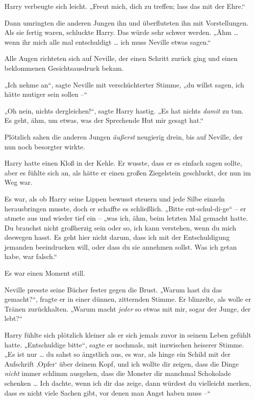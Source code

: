 Harry verbeugte sich leicht. „Freut mich, dich zu treffen; lass das mit der Ehre.“ 

Dann umringten die anderen Jungen ihn und überfluteten ihn mit Vorstellungen. Als sie fertig waren, schluckte Harry. Das würde sehr schwer werden. „Ähm … wenn ihr mich alle mal entschuldigt … ich muss Neville etwas sagen.“ 

Alle Augen richteten sich auf Neville, der einen Schritt zurück ging und einen beklommenen Gesichtsausdruck bekam. 

„Ich nehme an“, sagte Neville mit verschüchterter Stimme, „du willst sagen, ich hätte mutiger sein sollen –“ 

„Oh nein, nichts dergleichen!“, sagte Harry hastig. „Es hat nichts \emph{damit} zu tun. Es geht, ähm, um etwas, was der Sprechende Hut mir gesagt hat.“ 

Plötzlich sahen die anderen Jungen \emph{äußerst} neugierig drein, bis auf Neville, der nun noch besorgter wirkte. 

Harry hatte einen Kloß in der Kehle. Er wusste, dass er es einfach sagen sollte, aber es fühlte sich an, als hätte er einen großen Ziegelstein geschluckt, der nun im Weg war. 

Es war, als ob Harry seine Lippen bewusst steuern und jede Silbe einzeln herausbringen musste, doch er schaffte es schließlich. „Bitte ent-schul-di-ge“ – er atmete aus und wieder tief ein – „was ich, ähm, beim letzten Mal gemacht hatte. Du brauchst nicht großherzig sein oder so, ich kann verstehen, wenn du mich deswegen hasst. Es geht hier nicht darum, dass ich mit der Entschuldigung jemanden beeindrucken will, oder dass du sie annehmen sollst. Was ich getan habe, war falsch.“ 

Es war einen Moment still. 

Neville presste seine Bücher fester gegen die Brust. „Warum hast du das gemacht?“, fragte er in einer dünnen, zitternden Stimme. Er blinzelte, als wolle er Tränen zurückhalten. „Warum macht \emph{jeder} so etwas mit mir, sogar der Junge, der lebt?“ 

Harry fühlte sich plötzlich kleiner als er sich jemals zuvor in seinem Leben gefühlt hatte. „Entschuldige bitte“, sagte er nochmals, mit inzwischen heiserer Stimme. „Es ist nur … du sahst so ängstlich aus, es war, als hinge ein Schild mit der Aufschrift ‚Opfer‘ über deinem Kopf, und ich wollte dir zeigen, dass die Dinge \emph{nicht} immer schlimm ausgehen, dass die Monster dir manchmal Schokolade schenken … Ich dachte, wenn ich dir das zeige, dann würdest du vielleicht merken, dass es nicht viele Sachen gibt, vor denen man Angst haben muss –“ 

